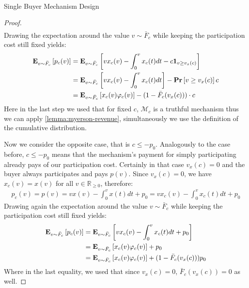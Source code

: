 \documentclass[11pt,a4paper]{article}
\newcommand{\RR}{\ensuremath{\mathbb{R}}}
\renewcommand{\Pr}[1]{\mbox{\rm\bf Pr}\left[#1\right]}
\newcommand{\Ex}[2][]{\mbox{\rm\bf E}_{#1}\left[#2\right]}
\newcommand{\1}[1]{\mbox{\rm\bf 1}_{#1}}
\begin{document}
\begin{section}{Single Buyer Mechanism Design}
\begin{proof}
\begin{align*}
     \end{align*}
     Drawing the expectation around the value $v \sim \bar{F}_c$ while keeping the participation cost still fixed yields:
     \begin{equation}
         \label{eq:expected-revenue-first-case}
         \begin{aligned}
             \Ex[v \sim \bar{F}_c]{p_c(v)} & = \Ex[v \sim \bar{F}_c]{v x_c(v) - \int_0^v x_c(t) dt - c \1{v \geq v_x(c)}}   \\
                                           & = \Ex[v \sim \bar{F}_c]{v x_c(v) - \int_0^v x_c(t) dt} - \Pr{v \geq v_x(c)}c   \\
                                           & = \Ex[v \sim \bar{F}_c]{x_c(v) \varphi_c(v)} - (1 - \bar{F}_c(v_x(c))) \cdot c \\
         \end{aligned}
     \end{equation}
     Here in the last step we used that for fixed $c$, $\mathcal{M}_c$ is a truthful mechanism thus we can apply \autoref{lemma:myerson-revenue}, simultaneously we use the definition of the cumulative distribution.

     Now we consider the opposite case, that is $c \leq -p_0$.
     Analogously to the case before, $c \leq -p_0$ means that the mechanism's payment for simply participating already pays of our participation cost.
     Certainly in that case $v_x(c) = 0$ and the buyer always participates and pays $p(v)$.
     Since $v_x(c) = 0$, we have $x_c(v) = x(v)$ for all $v \in \RR_{\geq 0}$, therefore:
     \begin{align*}
         p_c(v) = p(v) = v x(v) - \int_0^v x(t)dt + p_0 = v x_c(v) - \int_0^v x_c(t)dt + p_0
     \end{align*}
     Drawing again the expectation around the value $v \sim \bar{F}_c$ while keeping the participation cost still fixed yields:
     \begin{equation}
         \label{eq:expected-revenue-second-case}
         \begin{aligned}
             \Ex[v \sim \bar{F}_c]{p_c(v)} & = \Ex[v \sim \bar{F}_c]{v x_c(v) - \int_0^v x_c(t)dt + p_0}                  \\
                                           & = \Ex[v \sim \bar{F}_c]{x_c(v) \varphi_c(v)} + p_0                           \\
                                           & = \Ex[v \sim \bar{F}_c]{x_c(v) \varphi_c(v)} + (1 - \bar{F}_{c}(v_x(c))) p_0
         \end{aligned}
     \end{equation}
     Where in the last equality, we used that since $v_x(c) = 0$, $\bar{F}_{c}(v_x(c)) = 0$ as well.


\end{proof}
\end{section}
\end{document}
